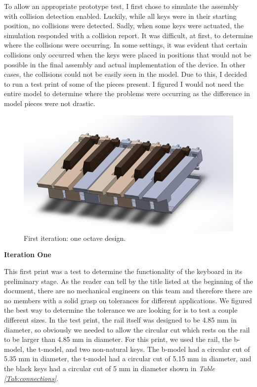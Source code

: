 To allow an appropriate prototype test, I first chose to simulate the assembly with collision detection enabled. Luckily, while all keys were in their starting position, no collisions were detected. Sadly, when some keys were actuated, the simulation responded with a collision report. It was difficult, at first, to determine where the collisions were occurring. In some settings, it was evident that certain collisions only occurred when the keys were placed in positions that would not be possible in the final assembly and actual implementation of the device. In other cases, the collisions could not be easily seen in the model. Due to this, I decided to run a test print of some of the pieces present. I figured I would not need the entire model to determine where the problems were occurring as the difference in model pieces were not drastic.

\begin{figure}[h!]
  \centering
  \includegraphics[width=0.9\linewidth]{image/AssembledModel.png}
  \caption{First iteration: one octave design.}
  \label{fig:assembled_model}
\end{figure}

\textbf{Iteration One}

This first print was a test to determine the functionality of the keyboard in its preliminary stage. As the reader can tell by the title listed at the beginning of the document, there are no mechanical engineers on this team and therefore there are no members with a solid grasp on tolerances for different applications. We figured the best way to determine the tolerance we are looking for is to test a couple different sizes. In the test print, the rail itself was designed to be 4.85 mm in diameter, so obviously we needed to allow the circular cut which rests on the rail to be larger than 4.85 mm in diameter. For this print, we used the rail, the b-model, the t-model, and two non-natural keys. The b-model had a circular cut of 5.35 mm in diameter, the t-model had a circular cut of 5.15 mm in diameter, and the black keys had a circular cut of 5 mm in diameter shown in \textit{Table \ref{Tab:connections}}.

